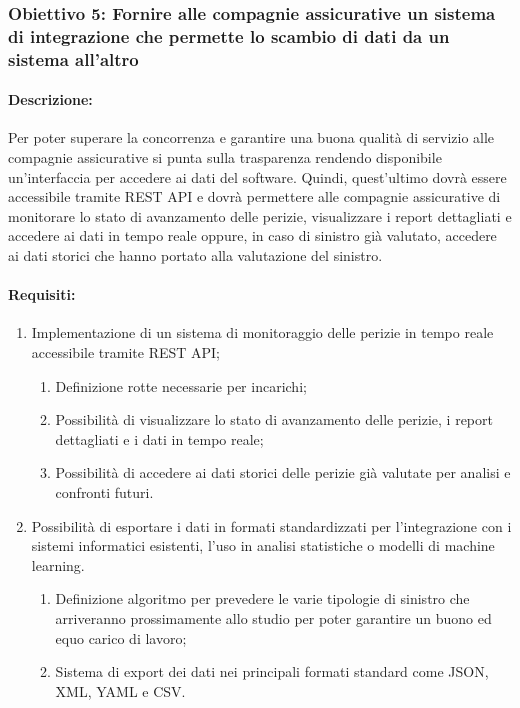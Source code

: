 \documentclass[a4paper,12pt, openright]{report}
\begin{document}
\subsubsection{Obiettivo 5: Fornire alle compagnie assicurative un sistema di integrazione che permette lo scambio di dati da un sistema all'altro}

\paragraph{Descrizione:}
Per poter superare la concorrenza e garantire una buona qualità di servizio alle compagnie assicurative si punta sulla trasparenza rendendo disponibile un'interfaccia per accedere ai dati del software. Quindi, quest'ultimo dovrà essere accessibile tramite REST API e dovrà permettere alle compagnie assicurative di monitorare lo stato di avanzamento delle perizie, visualizzare i report dettagliati e accedere ai dati in tempo reale oppure, in caso di sinistro già valutato, accedere ai dati storici che hanno portato alla valutazione del sinistro.

\paragraph{Requisiti:}
\begin{enumerate}
    \item Implementazione di un sistema di monitoraggio delle perizie in tempo reale accessibile tramite REST API;
    \begin{enumerate}
        \item Definizione rotte necessarie per incarichi;
        \item Possibilità di visualizzare lo stato di avanzamento delle perizie, i report dettagliati e i dati in tempo reale;
        \item Possibilità di accedere ai dati storici delle perizie già valutate per analisi e confronti futuri.
    \end{enumerate}
    \item Possibilità di esportare i dati in formati standardizzati per l'integrazione con i sistemi informatici esistenti, l'uso in analisi statistiche o modelli di machine learning.
    \begin{enumerate}
        \item Definizione algoritmo per prevedere le varie tipologie di sinistro che arriveranno prossimamente allo studio per poter garantire un buono ed equo carico di lavoro;
        \item Sistema di export dei dati nei principali formati standard come JSON, XML, YAML e CSV. 
    \end{enumerate}
\end{enumerate}
\end{document}
